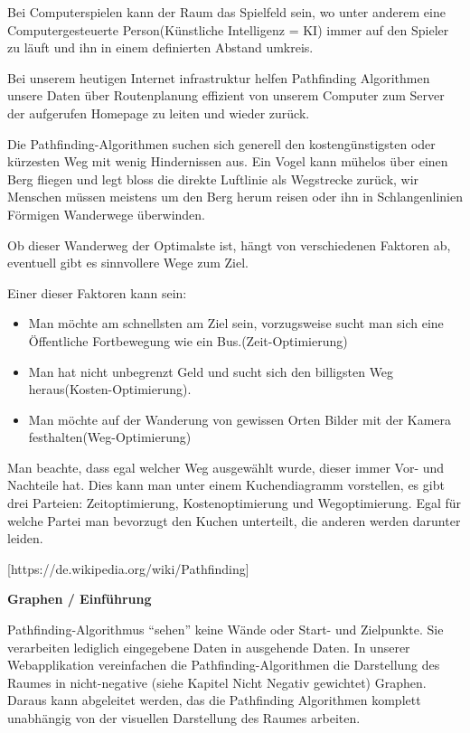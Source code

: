 Bei Computerspielen kann der Raum das Spielfeld sein, wo unter anderem
eine Computergesteuerte Person(Künstliche Intelligenz = KI) immer auf
den Spieler zu läuft und ihn in einem definierten Abstand umkreis.

Bei unserem heutigen Internet infrastruktur helfen Pathfinding
Algorithmen unsere Daten über Routenplanung effizient von unserem
Computer zum Server der aufgerufen Homepage zu leiten und wieder zurück.

Die Pathfinding-Algorithmen suchen sich generell den kostengünstigsten
oder kürzesten Weg mit wenig Hindernissen aus. Ein Vogel kann mühelos
über einen Berg fliegen und legt bloss die direkte Luftlinie als
Wegstrecke zurück, wir Menschen müssen meistens um den Berg herum reisen
oder ihn in Schlangenlinien Förmigen Wanderwege überwinden.

Ob dieser Wanderweg der Optimalste ist, hängt von verschiedenen Faktoren
ab, eventuell gibt es sinnvollere Wege zum Ziel.

Einer dieser Faktoren kann sein:

\begin{itemize}
\item
  Man möchte am schnellsten am Ziel sein, vorzugsweise sucht man sich
  eine Öffentliche Fortbewegung wie ein Bus.(Zeit-Optimierung)
\item
  Man hat nicht unbegrenzt Geld und sucht sich den billigsten Weg
  heraus(Kosten-Optimierung).
\item
  Man möchte auf der Wanderung von gewissen Orten Bilder mit der Kamera
  festhalten(Weg-Optimierung)
\end{itemize}

Man beachte, dass egal welcher Weg ausgewählt wurde, dieser immer Vor-
und Nachteile hat. Dies kann man unter einem Kuchendiagramm vorstellen,
es gibt drei Parteien: Zeitoptimierung, Kostenoptimierung und
Wegoptimierung. Egal für welche Partei man bevorzugt den Kuchen
unterteilt, die anderen werden darunter leiden.

{[}https://de.wikipedia.org/wiki/Pathfinding{]}

\textbf{Graphen / Einführung}

Pathfinding-Algorithmus ``sehen'' keine Wände oder Start- und
Zielpunkte. Sie verarbeiten lediglich eingegebene Daten in ausgehende
Daten. In unserer Webapplikation vereinfachen die
Pathfinding-Algorithmen die Darstellung des Raumes in nicht-negative
(siehe Kapitel Nicht Negativ gewichtet) Graphen. Daraus kann abgeleitet
werden, das die Pathfinding Algorithmen komplett unabhängig von der
visuellen Darstellung des Raumes arbeiten.

